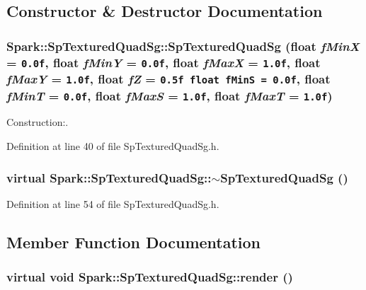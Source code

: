 \subsection{Constructor \& Destructor Documentation}
\subsubsection{\setlength{\rightskip}{0pt plus 5cm}Spark::Sp\-Textured\-Quad\-Sg::Sp\-Textured\-Quad\-Sg (float {\em f\-Min\-X} = {\tt 0.0f}, float {\em f\-Min\-Y} = {\tt 0.0f}, float {\em f\-Max\-X} = {\tt 1.0f}, float {\em f\-Max\-Y} = {\tt 1.0f}, float {\em f\-Z} = {\tt 0.5f\ float\ fMinS\ =\ 0.0f}, float {\em f\-Min\-T} = {\tt 0.0f}, float {\em f\-Max\-S} = {\tt 1.0f}, float {\em f\-Max\-T} = {\tt 1.0f})\hspace{0.3cm}{\tt  [inline]}}\label{classSpark_1_1SpTexturedQuadSg_a0}


Construction:. 

Definition at line 40 of file Sp\-Textured\-Quad\-Sg.h.
\subsubsection{\setlength{\rightskip}{0pt plus 5cm}virtual Spark::Sp\-Textured\-Quad\-Sg::$\sim${\bf Sp\-Textured\-Quad\-Sg} ()\hspace{0.3cm}{\tt  [inline, virtual]}}\label{classSpark_1_1SpTexturedQuadSg_a1}


Definition at line 54 of file Sp\-Textured\-Quad\-Sg.h.

\subsection{Member Function Documentation}
\subsubsection{\setlength{\rightskip}{0pt plus 5cm}virtual void Spark::Sp\-Textured\-Quad\-Sg::render ()\hspace{0.3cm}{\tt  [inline, virtual]}}\label{classSpark_1_1SpTexturedQuadSg_a2}


